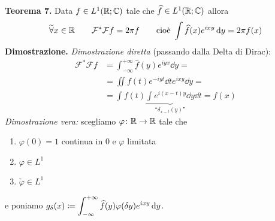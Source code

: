 \textbf{Teorema 7.}
Data $f \in L^1(\mathbb R; \mathbb C)$ tale che $\widehat f \in L^1(\mathbb R; \mathbb C)$ allora
$$
\widetilde\forall x \in \mathbb R
\qquad
\mathcal F^* \mathcal F f = 2 \pi f
\qquad
\text{cioè }
\int \widehat f(x) e^{ixy} \,\mathrm{d} y = 2\pi f(x)
$$
\textbf{Dimostrazione.}
\textit{Dimostrazione diretta} (passando dalla Delta di Dirac):
$$
\begin{aligned}
	\mathcal F^* \mathcal F f 
	&= \int_{-\infty}^{+\infty} \hat f(y) e^{iyx} \dd y = \\
	&= \iint f(t) e^{-iyt} \dd t e^{ixy} \dd y = \\
	&= \int f(t) \underbrace{\int e^{i(x-t)y} \dd y}_{\text{``$\delta_{x-t}(y)$''}} \dd t = f(x)
\end{aligned}
$$
\textit{Dimostrazione vera:} scegliamo $\varphi \colon \mathbb R \to \mathbb R$ tale che
\begin{enumerate}
	\item $\varphi(0) = 1$ continua in $0$ e $\varphi$ limitata
	\item $\varphi \in L^1$
	\item $\check\varphi \in L^1$
\end{enumerate}
e poniamo $g_\delta(x) \coloneqq \displaystyle \int_{-\infty}^{+\infty} \widehat f(y) \varphi(\delta y) e^{ixy} \,\mathrm{d} y$.
